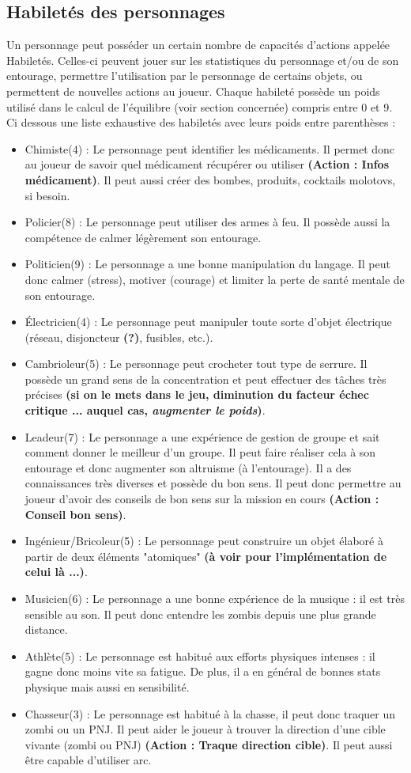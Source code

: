 \subsection{Habiletés des personnages}
Un personnage peut posséder un certain nombre de capacités d'actions appelée Habiletés. Celles-ci peuvent jouer sur les statistiques du personnage et/ou de son entourage, permettre l'utilisation par le personnage de certains objets, ou permettent de nouvelles actions au joueur. Chaque habileté possède un poids utilisé dans le calcul de l'équilibre (voir section concernée) compris entre 0 et 9. Ci dessous une liste exhaustive des habiletés avec leurs poids entre parenthèses :
\begin{itemize}
  \item Chimiste(4) : Le personnage peut identifier les médicaments. Il permet donc au joueur de savoir quel médicament récupérer ou utiliser \textbf{(Action : Infos médicament)}. Il peut aussi créer des bombes, produits, cocktails molotovs, si besoin.
  \item Policier(8) : Le personnage peut utiliser des armes à feu. Il possède aussi la compétence de calmer légèrement son entourage.
  \item Politicien(9) : Le personnage a une bonne manipulation du langage. Il peut donc calmer (stress), motiver (courage) et limiter la perte de santé mentale de son entourage.
  \item Électricien(4) : Le personnage peut manipuler toute sorte d'objet électrique (réseau, disjoncteur \textbf{(?)}, fusibles, etc.).
  \item Cambrioleur(5) : Le personnage peut crocheter tout type de serrure. Il possède un grand sens de la concentration et peut effectuer des tâches très précises \textbf{(si on le mets dans le jeu, diminution du facteur échec critique ... auquel cas, \emph{augmenter le poids})}.
  \item Leadeur(7) : Le personnage a une expérience de gestion de groupe et sait comment donner le meilleur d'un groupe. Il peut faire réaliser cela à son entourage et donc augmenter son altruisme (à l'entourage). Il a des connaissances très diverses et possède du bon sens. Il peut donc permettre au joueur d'avoir des conseils de bon sens sur la mission en cours \textbf{(Action : Conseil bon sens)}.
  \item Ingénieur/Bricoleur(5) : Le personnage peut construire un objet élaboré à partir de deux éléments "atomiques" \textbf{(à voir pour l'implémentation de celui là ...)}.
  \item Musicien(6) : Le personnage a une bonne expérience de la musique : il est très sensible au son. Il peut donc entendre les zombis depuis une plus grande distance.
  \item Athlète(5) : Le personnage est habitué aux efforts physiques intenses : il gagne donc moins vite sa fatigue. De plus, il a en général de bonnes stats physique mais aussi en sensibilité.
  \item Chasseur(3) : Le personnage est habitué à la chasse, il peut donc traquer un zombi ou un PNJ. Il peut  aider le joueur à trouver la direction d'une cible vivante (zombi ou PNJ) \textbf{(Action : Traque direction cible)}. Il peut aussi être capable d'utiliser arc.
\end{itemize}
